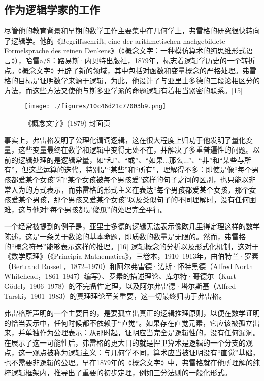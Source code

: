 \subsection{作为逻辑学家的工作}  
尽管他的教育背景和早期的数学工作主要集中在几何学上，弗雷格的研究很快转向了逻辑学。他的《Begriffsschrift, eine der arithmetischen nachgebildete Formelsprache des reinen Denkens》（《概念文字：一种模仿算术的纯思维形式语言》），哈雷a/S：路易斯·内贝特出版社，1879年，标志着逻辑学历史的一个转折点。《概念文字》开辟了新的领域，其中包括对函数和变量概念的严格处理。弗雷格的目标是证明数学来源于逻辑，为此，他设计了与亚里士多德的三段论相区分的方法，而这些方法又使他与斯多亚学派的命题逻辑有着相当紧密的联系。[15]
\begin{figure}[ht]
\centering
\texttt{[image: ./figures/10c46d21c77003b9.png]}
\caption{《概念文字》(1879) 封面页} \label{fig_Gottlo_2}
\end{figure}
事实上，弗雷格发明了公理化谓词逻辑，这在很大程度上归功于他发明了量化变量，这些变量最终在数学和逻辑中变得无处不在，并解决了多重普遍性的问题。以前的逻辑处理的是逻辑常量，如“和”、“或”、“如果...那么...”、“非”和“某些与所有”，但这些运算的迭代，特别是“某些”和“所有”，理解得不多：即使是像“每个男孩都爱某个女孩”和“某个女孩被每个男孩爱”这样的句子之间的区别，也只能以非常人为的方式表示，而弗雷格的形式主义在表达“每个男孩都爱某个女孩，那个女孩爱某个男孩，那个男孩又爱某个女孩”以及类似句子的不同理解时，没有任何困难，这与他对“每个男孩都是傻瓜”的处理完全平行。

一个经常被提到的例子是，亚里士多德的逻辑无法表示像欧几里得定理这样的数学陈述，这是一条关于数论的基本命题，即质数的数量是无限的。然而，弗雷格的“概念符号”能够表示这样的推理。[16] 逻辑概念的分析以及形式化机制，这对于《数学原理》（《Principia Mathematica》，三卷本，1910–1913年，由伯特兰·罗素（Bertrand Russell，1872–1970）和阿尔弗雷德·诺斯·怀特黑德（Alfred North Whitehead，1861–1947）编写）、罗素的描述理论、库尔特·哥德尔（Kurt Gödel，1906–1978）的不完备性定理，以及阿尔弗雷德·塔尔斯基（Alfred Tarski，1901–1983）的真理理论至关重要，这一切最终归功于弗雷格。

弗雷格所声明的一个主要目的，是要孤立出真正的逻辑推理原则，以便在数学证明的恰当表示中，任何时候都不依赖于“直觉”。如果存在直觉元素，它应该被孤立出来，并单独作为公理表示：从那时起，证明应当完全是逻辑性的，没有任何漏洞。在展示了这一可能性后，弗雷格的更大目的就是捍卫算术是逻辑的一个分支的观点，这一观点被称为逻辑主义：与几何学不同，算术应当被证明没有“直觉”基础，也不需要非逻辑的公理。早在1879年的《概念文字》中，弗雷格就在他所理解的纯粹逻辑框架内，推导出了重要的初步定理，例如三分法则的一般化形式。